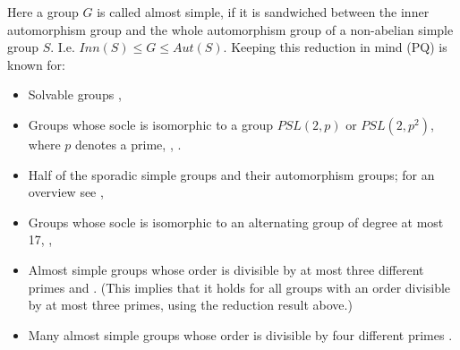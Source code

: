 \documentclass[a4paper,11pt]{report}
\begin{document}
{{ Here a group $G$ is called almost simple, if it is sandwiched between the inner automorphism
group and the whole automorphism group of a non-abelian simple group $S$. I.e. $Inn(S) \leq G \leq Aut(S).$ Keeping this reduction in mind (PQ) is known for: 
\begin{itemize}
\item  Solvable groups \cite{KimmiPQ}, 
\item  Groups whose socle is isomorphic to a group $PSL(2,p)$ or $PSL(2,p^2)$, where $p$ denotes a prime, \cite{HertweckBrauer}, \cite{BaMa4prI}. 
\item  Half of the sporadic simple groups and their automorphism groups; for an
overview see \cite{KonovalovKimmiStAndrews}, 
\item  Groups whose socle is isomorphic to an alternating group of degree at most 17, \cite{SalimA7A8} \cite{SalimA9A10}\cite{BaCa}, 
\item  Almost simple groups whose order is divisible by at most three different
primes \cite{KonovalovKimmiStAndrews} and \cite{BaMaM10}. (This implies that it holds for all groups with an order divisible by at
most three primes, using the reduction result above.) 
\item  Many almost simple groups whose order is divisible by four different primes \cite{BaMa4prI}\cite{BaMa4prII}. 
\end{itemize}
 }

 }

   
\end{document}
